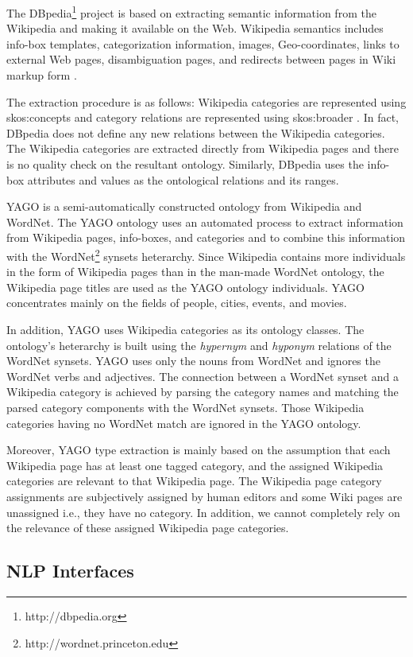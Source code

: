 The DBpedia\footnote{http://dbpedia.org} project is based on extracting
semantic information from the Wikipedia and making it available on the
Web. Wikipedia semantics includes info-box templates, categorization
information, images, Geo-coordinates, links to external Web pages,
disambiguation pages, and redirects between pages in Wiki markup form
\cite{Auer07dbpedia:a, Bizer2009}. 

The extraction procedure is as follows: Wikipedia categories are represented
using skos:concepts and category relations are represented using skos:broader
\cite{Auer07dbpedia:a, Bizer2009}. In fact, DBpedia does not define any new
relations between the Wikipedia categories. The Wikipedia categories are
extracted directly from Wikipedia pages and there is no quality check on the
resultant ontology. Similarly, DBpedia uses the info-box attributes and values
as the ontological relations and its ranges.   

YAGO is a semi-automatically constructed ontology from Wikipedia and
WordNet\cite{Suchanek2009phd}. The YAGO ontology uses an automated process to
extract information from Wikipedia pages, info-boxes, and categories and to
combine this information with the WordNet\footnote{http://wordnet.princeton.edu}
synsets heterarchy. Since Wikipedia contains more individuals in the form of
Wikipedia pages than in the man-made WordNet ontology, the Wikipedia page titles
are used as the YAGO ontology individuals. YAGO concentrates mainly on the
fields of people, cities, events, and movies\cite{Suchanek2009phd}. 

In addition, YAGO uses Wikipedia categories as its ontology classes. The
ontology's heterarchy is built using the \textit{hypernym} and \textit{hyponym}
relations of the WordNet synsets. YAGO uses only the nouns from WordNet and
ignores the WordNet verbs and adjectives. The connection between a WordNet
synset and a Wikipedia category is achieved by parsing the category names and
matching the parsed category components with the WordNet
synsets\cite{Suchanek2009phd}. Those Wikipedia categories having no WordNet
match are ignored in the YAGO ontology.  
  
Moreover, YAGO type extraction is mainly based on the assumption that
each Wikipedia page has at least one tagged category, and the assigned Wikipedia
categories are relevant to that Wikipedia page. The Wikipedia page category
assignments are subjectively assigned by human editors and some Wiki pages are
unassigned i.e., they have no category. In addition, we cannot completely rely
on the relevance of these assigned Wikipedia page categories. 


\subsection{NLP Interfaces} 
